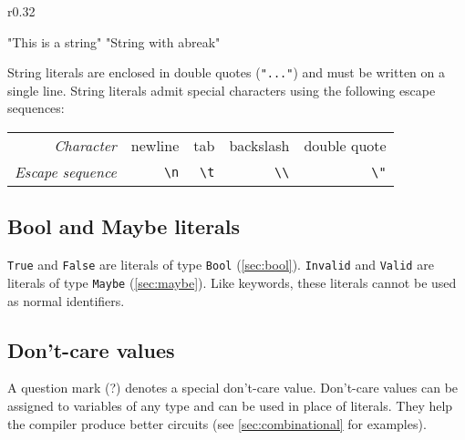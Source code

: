 \begin{wrapfigure}{r}{0.32\columnwidth}
\vspace{-2em}
\begin{mscode}
"This is a string"
"String with a\nline break"
\end{mscode}
\vspace{-2em}
\end{wrapfigure}

String literals are enclosed in double quotes (\verb|"..."|) and must be written on a single line.
String literals admit special characters using the following escape sequences:

\begin{tabular}{rrrrr}
  \emph{Character} & newline & tab & backslash & double quote \\
  \emph{Escape sequence} & \verb|\n| & \verb|\t| & \verb|\\|& \verb|\"| \\
\end{tabular}

\subsection{Bool and Maybe literals}

\verb|True| and \verb|False| are literals of type \verb|Bool| (\autoref{sec:bool}).
\verb|Invalid| and \verb|Valid| are literals of type \verb|Maybe| (\autoref{sec:maybe}).
Like keywords, these literals cannot be used as normal identifiers.

\subsection{Don't-care values}

A question mark (?) denotes a special don't-care value.
Don't-care values can be assigned to variables of any type and can be used in place of literals.
They help the compiler produce better circuits (see \autoref{sec:combinational} for examples). %

